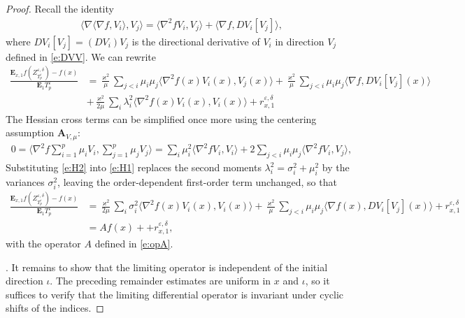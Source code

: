 \documentclass[10pt]{article}
\newcommand{\E}{\mathbf{E}}
\newcommand{\1}{1\!\!\!\;{\rm I}}
\theoremstyle{plain}
\theoremstyle{definition}
\newcommand{\e}{\varepsilon}
\newcommand{\ba}{\begin{equation}\begin{aligned}}
\newcommand{\ea}{\end{aligned}\end{equation}}
\numberwithin{equation}{section}
\begin{document}
\begin{proof}
Recall the identity
\ba
\langle \nabla \langle \nabla f,  V_i\rangle, V_j \rangle
= \langle \nabla^2 f  V_i , V_j \rangle + \langle \nabla f,  D V_i[V_j] \rangle,
\ea
where $D V_i[V_j]=(DV_i)V_j$ is the directional derivative of $V_i$ in direction $V_j$ defined in \eqref{e:DVV}.
We can rewrite
\ba
\label{e:H1}
\frac{\E_{x,1}f(Z^{\e,\delta}_{T_p^\e}) -f(x)}{\E_1 T^\e_p}
&= \frac{\varkappa^2}{\mu} \sum_{j<i} \mu_i\mu_j \langle \nabla^2 f(x)  V_i(x) , V_j(x) \rangle
+ \frac{\varkappa^2}{\mu} \sum_{j<i} \mu_i\mu_j  \langle \nabla f,  D V_i[V_j](x) \rangle\\
&+\frac{\varkappa^2}{2\mu} \sum_{i}  \lambda_i^2 \langle \nabla^2 f(x)V_i(x), V_i(x)\rangle
+r^{\e,\delta}_{x,1}
\ea
The Hessian cross terms can be simplified once more using the centering assumption $\mathbf{A}_{V,\mu}$:
\ba
\label{e:H2}
0=\Big\langle \nabla^2 f \sum_{i=1}^{p} \mu_i V_i,  \sum_{j=1}^{p} \mu_j V_j\Big\rangle
=\sum_{i} \mu_i^2 \langle \nabla^2 f V_i, V_i\rangle
+ 2 \sum_{j<i} \mu_i\mu_j \langle \nabla^2 f V_i, V_j\rangle,
\ea
Substituting \eqref{e:H2} into \eqref{e:H1} replaces the second moments $\lambda_i^2=\sigma_i^2+\mu_i^2$ by the variances $\sigma_i^2$,
leaving the order-dependent first-order term unchanged, so that
\ba
\label{e:AA}
\frac{\E_{x,1}f(Z^{\e,\delta}_{T_p^\e}) -f(x)}{\E_1 T^\e_p}
&=
\frac{\varkappa^2}{2\mu} \sum_i  \sigma_{i}^2
\langle \nabla^2 f(x)V_i(x), V_i(x)\rangle
+\frac{\varkappa^2}{\mu} \sum_{j<i}
\mu_i\mu_j  \langle \nabla f(x),  D V_i[V_j](x) \rangle
+r^{\e,\delta}_{x,1}\\
&= Af(x) + +r^{\e,\delta}_{x,1},
\ea
with the operator $A$ defined in \eqref{e:opA}.

\smallskip
{}.
It remains to show that the limiting operator is independent of the initial direction $\iota$.
The preceding remainder estimates are uniform in $x$ and $\iota$,
so it suffices to verify that the limiting differential operator is invariant under cyclic shifts of the indices.


\end{proof}
\end{document}
